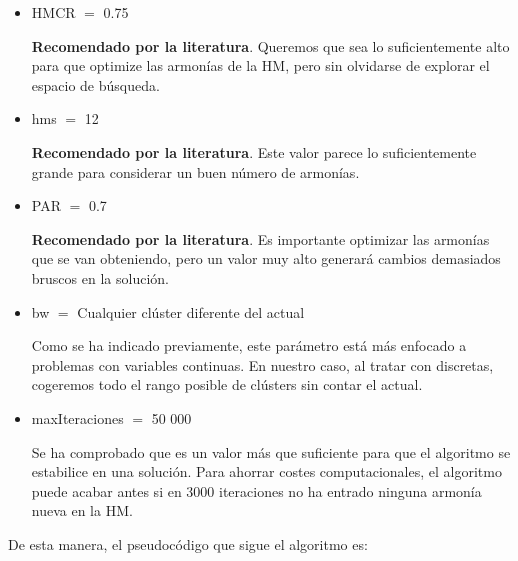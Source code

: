 \begin{itemize}
    \item HMCR $=$ 0.75
    
    \textbf{Recomendado por la literatura}. Queremos que sea lo suficientemente alto para que optimize las armonías de la HM, pero sin olvidarse de explorar el espacio de búsqueda.

    \item hms $=$ 12
    
    \textbf{Recomendado por la literatura}. Este valor parece lo suficientemente grande para considerar un buen número de armonías.

    \item PAR $=$ 0.7
    
    \textbf{Recomendado por la literatura}. Es importante optimizar las armonías que se van obteniendo, pero un valor muy alto generará cambios demasiados bruscos en la solución.

    \item bw $=$ Cualquier clúster diferente del actual
    
    Como se ha indicado previamente, este parámetro está más enfocado a problemas con variables continuas. En nuestro caso, al tratar con discretas, cogeremos todo el rango posible de clústers sin contar el actual.

    \item maxIteraciones $=$ 50 000
    
    Se ha comprobado que es un valor más que suficiente para que el algoritmo se estabilice en una solución. Para ahorrar costes computacionales, el algoritmo puede acabar antes si en 3000 iteraciones no ha entrado ninguna armonía nueva en la HM.
\end{itemize}

\newpage

De esta manera, el pseudocódigo que sigue el algoritmo es:
\vspace{\baselineskip}

